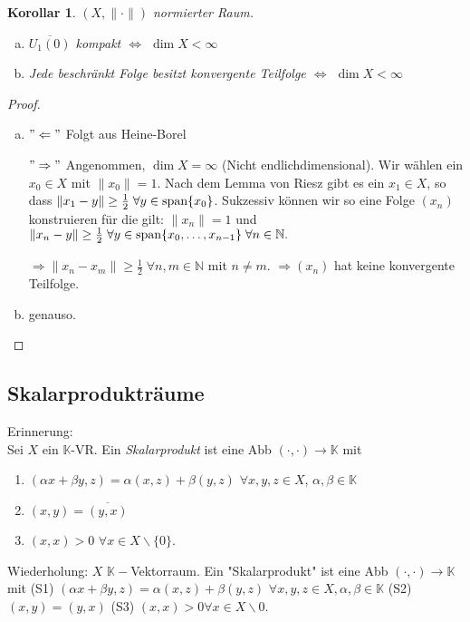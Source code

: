 \documentclass[ngerman]{report}
\theoremstyle{plain}%
\newtheorem{cor}[thm]{Korollar}
\theoremstyle{definition}%
\theoremstyle{myStyle}
\newcommand{\N}{\mathbb{N}}
\newcommand{\K}{\mathbb{K}}
\newcommand{\aufspan}{\textnormal{span}}
\newcommand{\norm}[1]{\|#1\|}
\newcommand{\df}[1][]{%
	\overset{#1}{\Rightarrow}
}
\newcommand{\aq}{\Leftrightarrow} %
\newcommand{\qmarks}[1]{"#1"}
\newcommand{\ov}[1]{\overline{#1}}
\begin{document}
	\begin{cor}
		$(X,\norm{\cdot})$ normierter Raum.
			\begin{enumerate}[a)] 
				\item $\overline{U_1(0)}$ kompakt $\aq$ $\dim X < \infty$
				\item Jede beschränkt Folge besitzt konvergente Teilfolge $\aq$ $\dim X < \infty$
			\end{enumerate}
	\end{cor}

	\begin{proof}
		 \begin{enumerate}[a)]
			 \item $"\Leftarrow"$ Folgt aus Heine-Borel\par
				$"\Rightarrow"$ Angenommen, $\dim X = \infty$ (Nicht endlichdimensional). 
				Wir wählen ein $x_0 \in X$ mit $\norm{x_0} = 1$. Nach dem Lemma von Riesz gibt es ein $x_1 \in X$, so dass 
				$\norm{x_1 - y} \geq \frac{1}{2} \; \forall y \in \aufspan\{x_0\}$. 
				Sukzessiv können wir so eine Folge $(x_n)$ konstruieren für die gilt: $\norm{x_n} = 1$ und $\norm{x_n - y} \geq \frac{1}{2} \; \forall y\in \aufspan\{x_0,\dots,x_{n-1}\}\; \forall n\in\N.$ \par
				$\df \norm{x_n - x_m} \geq \frac{1}{2}\; \forall n,m \in \N$  mit $n \not = m$. 
				$\df (x_n)$ hat keine konvergente Teilfolge. \par
			\item genauso.
		\end{enumerate}
	\end{proof}
	\subsection{Skalarprodukträume}
Erinnerung:\\
	Sei $X$ ein $\K$-VR. Ein \textit{Skalarprodukt} ist eine Abb $(\cdot,\cdot) \to \K$ mit 
	\begin{enumerate}[(S1)]
		\item $(\alpha x + \beta y, z) = \alpha (x,z) + \beta (y,z)$ $\forall x,y,z \in X$, $\alpha,\beta \in \K$
		\item $(x,y) = \ov{(y,x)}$
		\item $(x,x) > 0$  $\forall x\in X\backslash\{0\}$.
	\end{enumerate}

	Wiederholung: $X$ $\K-$Vektorraum. Ein \qmarks{Skalarprodukt} ist eine Abb $(\cdot,\cdot) \to \K$ mit (S1) $(\alpha x + \beta y, z) = \alpha (x,z) + \beta (y,z)$ $\forall x,y,z \in X, \alpha,\beta \in \K$
	(S2) $(x,y) = (y,x)$
	(S3) $(x,x) > 0 \forall x\in X\backslash{0}$.
\end{document}
